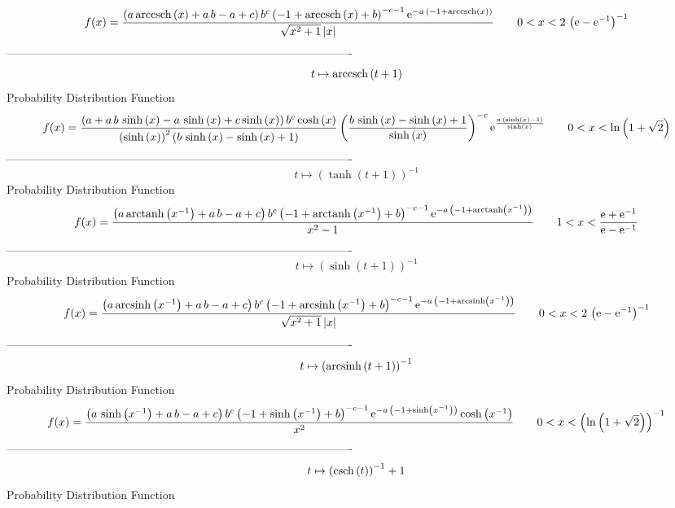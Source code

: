 \documentclass[12pt]{article}
\begin{document}
$$  f(x)={\frac { \left( a\,{\rm arccsch} \left(x\right)+a\,b-a+c \right) {b}^{
c} \left( -1+{\rm arccsch} \left(x\right)+b \right) ^{-c-1}{{\rm e}^{-
a\, \left( -1+{\rm arccsch} \left(x\right) \right) }}}{\sqrt {{x}^{2}+
1} \left| x \right| }}
 \qquad0
 < x < 2\, \left( {\rm e}-{{\rm e}^{-1}} \right) ^{-1}
$$-------------------------------------------------------------------------------------------  \\$$t\mapsto {\rm arccsch} \left(t+1\right)
$$Probability Distribution Function 
$$  f(x)={\frac { \left( a+a\,b\,\sinh \left( x \right) -a\,\sinh \left( x
 \right) +c\sinh \left( x \right)  \right) {b}^{c}\cosh \left( x
 \right) }{ \left( \sinh \left( x \right)  \right) ^{2} \left( b\,
\sinh \left( x \right) -\sinh \left( x \right) +1 \right) } \left( {
\frac {b\,\sinh \left( x \right) -\sinh \left( x \right) +1}{\sinh
 \left( x \right) }} \right) ^{-c}{{\rm e}^{{\frac {a\, \left( \sinh
 \left( x \right) -1 \right) }{\sinh \left( x \right) }}}}}
 \qquad0
 < x < \ln  \left( 1+\sqrt {2} \right) 
$$-------------------------------------------------------------------------------------------  \\$$t\mapsto  \left( \tanh \left( t+1 \right)  \right) ^{-1}
$$Probability Distribution Function 
$$  f(x)={\frac { \left( a\,{\rm arctanh} \left({x}^{-1}\right)+a\,b-a+c
 \right) {b}^{c} \left( -1+{\rm arctanh} \left({x}^{-1}\right)+b
 \right) ^{-c-1}{{\rm e}^{-a\, \left( -1+{\rm arctanh} \left({x}^{-1}
\right) \right) }}}{{x}^{2}-1}}
 \qquad1
 < x < {\frac {{\rm e}+{{\rm e}^{-1}}}{{\rm e}-{{\rm e}^{-1}}}}
$$-------------------------------------------------------------------------------------------  \\$$t\mapsto  \left( \sinh \left( t+1 \right)  \right) ^{-1}
$$Probability Distribution Function 
$$  f(x)={\frac { \left( a\,{\rm arcsinh} \left({x}^{-1}\right)+a\,b-a+c
 \right) {b}^{c} \left( -1+{\rm arcsinh} \left({x}^{-1}\right)+b
 \right) ^{-c-1}{{\rm e}^{-a\, \left( -1+{\rm arcsinh} \left({x}^{-1}
\right) \right) }}}{\sqrt {{x}^{2}+1} \left| x \right| }}
 \qquad0
 < x < 2\, \left( {\rm e}-{{\rm e}^{-1}} \right) ^{-1}
$$-------------------------------------------------------------------------------------------  \\$$t\mapsto  \left( {\rm arcsinh} \left(t+1\right) \right) ^{-1}
$$Probability Distribution Function 
$$  f(x)={\frac { \left( a\,\sinh \left( {x}^{-1} \right) +a\,b-a+c \right) {b}
^{c} \left( -1+\sinh \left( {x}^{-1} \right) +b \right) ^{-c-1}{
{\rm e}^{-a\, \left( -1+\sinh \left( {x}^{-1} \right)  \right) }}\cosh
 \left( {x}^{-1} \right) }{{x}^{2}}}
 \qquad0
 < x <  \left( \ln  \left( 1+\sqrt {2} \right)  \right) ^{-1}
$$-------------------------------------------------------------------------------------------  \\$$t\mapsto  \left( {\rm csch} \left(t\right) \right) ^{-1}+1
$$Probability Distribution Function 
\end{document}
